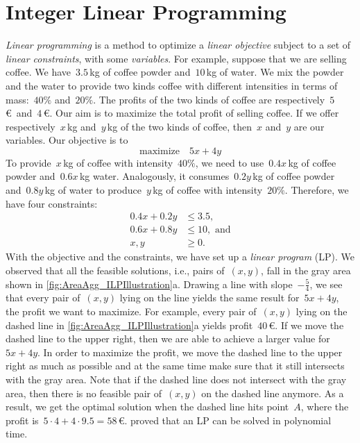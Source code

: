 \section{Integer Linear Programming}
\label{sec:AreaAgg_ILP}

\emph{Linear programming} is a method 
to optimize a \emph{linear objective}
subject to a set of \emph{linear constraints},
with some \emph{variables}.
For example, suppose that we are selling coffee.
We have~$3.5\,$kg of coffee powder and~$10\,$kg of water.
We mix the powder and the water to provide two kinds coffee 
with different intensities in terms of mass:~$40\%$ and~$20\%$.
The profits of the two kinds of coffee 
are respectively~$5\,$\euro~and~$4\,$\euro.
Our aim is to maximize the total profit of selling coffee.
If we offer respectively~$x\,$kg and~$y\,$kg 
of the two kinds of coffee,
then~$x$ and~$y$ are our variables.
Our objective is to
$$
\mathrm{maximize} 	\quad	 5x+4y
$$
To provide~$x\,$kg of coffee with intensity~$40\%$,
we need to use~$0.4x\,$kg of coffee powder 
and~$0.6x\,$kg water.
Analogously, it consumes~$0.2y\,$kg of coffee powder 
and~$0.8y\,$kg of water to produce~$y\,$kg of coffee
with intensity~$20\%$.
Therefore, we have four constraints:
\begin{align*}
0.4x+0.2y	&\le 3.5,				\\
0.6x+0.8y 	&\le 10,	\text{~and}			\\
x,y			&\ge 0.
\end{align*}
With the objective and the constraints, 
we have set up a \emph{linear program} (LP).
We observed that 
all the feasible solutions, i.e., pairs of~$(x,y)$,
fall in the gray area 
shown in \fig\ref{fig:AreaAgg_ILPIllustration}a.
Drawing a line with slope~$-\frac{5}{4}$,
we see that every pair of~$(x,y)$ lying on the line
yields the same result for~$5x+4y$, 
the profit we want to maximize.
For example, every pair of~$(x,y)$ lying on the dashed line
in \fig\ref{fig:AreaAgg_ILPIllustration}a 
yields profit~$40\,$\euro.
If we move the dashed line to the upper right,
then we are able to achieve a larger value for~$5x+4y$. 
In order to maximize the profit, 
we move the dashed line to the upper right as much as possible
and at the same time make sure that 
it still intersects with the gray area.
Note that if the dashed line 
does not intersect with the gray area,
then there is no feasible pair of~$(x,y)$ 
on the dashed line anymore.
As a result, we get the optimal solution 
when the dashed line hits point~$A$,
where the profit is~$5 \cdot 4 + 4 \cdot 9.5 =58\,$\euro.
\textcite{Karmarkar1984LP}
proved that an LP can be solved in polynomial time.

